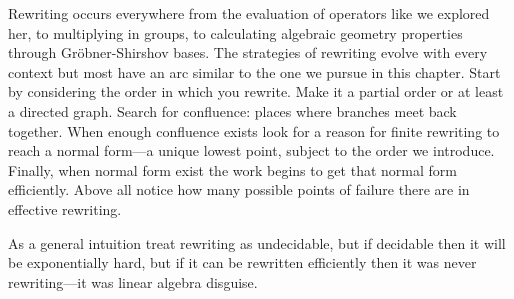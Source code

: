 Rewriting 
occurs everywhere from the evaluation of operators like we explored her, 
to multiplying in groups, to calculating algebraic geometry properties through 
Gr\"obner-Shirshov bases.  The strategies of rewriting evolve with every context 
but most have an arc similar to the one we pursue in this chapter.  Start by 
considering the order in which you rewrite.  Make it a partial order or at 
least a directed graph.  Search for confluence: places where branches meet back
together.  When enough confluence exists look for a reason for finite rewriting 
to reach a normal form---a unique lowest point, subject to the order we introduce.
Finally, when normal form exist the work begins to get that normal form efficiently.
Above all notice how many possible points of failure there are in effective 
rewriting.  

As a general intuition treat rewriting as undecidable, but if decidable 
then it will be exponentially hard, but if it can be rewritten efficiently 
then it was never rewriting---it was linear algebra disguise.